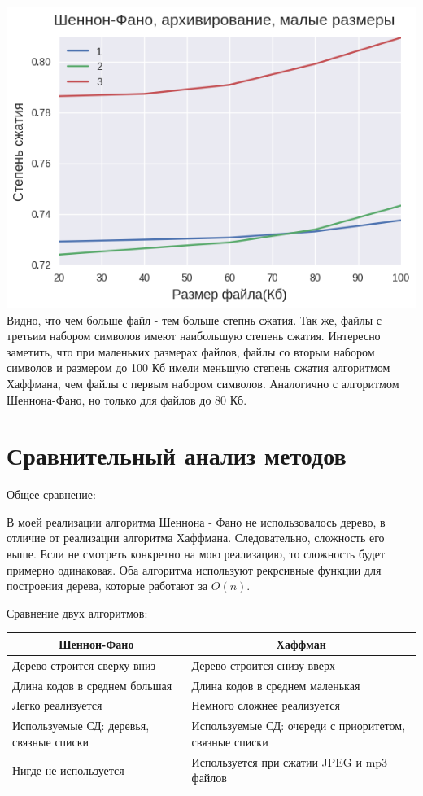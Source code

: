 \documentclass[russian, a4paper, 12pt]{article}
\begin{document}
\includegraphics[width=0.9\linewidth]{./plots/additional/shan_arc_small.png}\\


Видно, что чем больше файл - тем больше степнь сжатия. Так же, файлы с третьим набором символов имеют
наибольшую степень сжатия. Интересно заметить, что при маленьких размерах файлов,
файлы со вторым набором символов и размером до 100 Кб имели меньшую степень сжатия алгоритмом
Хаффмана, чем файлы с первым набором символов. Аналогично с алгоритмом Шеннона-Фано, но только
для файлов до 80 Кб.
\newpage
\section{Сравнительный анализ методов}
Общее сравнение:

В моей реализации алгоритма Шеннона - Фано не использовалось дерево, в отличие от
реализации алгоритма Хаффмана. Следовательно, сложность его выше. Если не смотреть конкретно
на мою реализацию, то сложность будет примерно одинаковая. Оба алгоритма используют рекрсивные
функции для построения дерева, которые работают за $O(n)$.

Сравнение двух алгоритмов:

\begin{center}
    \begin{tabular}{ | p{8cm} | p{8cm} |}
    \hline
    \multicolumn{1}{|c|}{\textbf{Шеннон-Фано}} & \multicolumn{1}{|c|}{\textbf{Хаффман}} \\ \hline
    Дерево строится сверху-вниз & Дерево строится снизу-вверх\\ \hline
    Длина кодов в среднем большая & Длина кодов в среднем маленькая\\ \hline
    Легко реализуется & Немного сложнее реализуется\\ \hline
    Используемые СД: деревья, связные списки & Используемые СД: очереди с приоритетом, связные списки\\ \hline
    Нигде не используется & Используется при сжатии JPEG и mp3 файлов\\ \hline
    \end{tabular}
\end{center}
\end{document}
